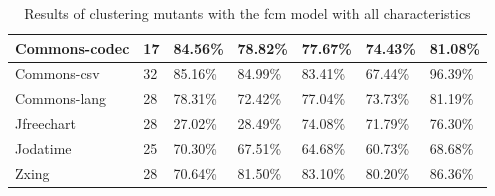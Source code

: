 \documentclass[../../main]{subfiles}
\begin{document}
\begin{table}[!htb]
\begin{tabular}{|l|l|l|l|l|l|l|}
Commons-codec         & 17                   & 84.56\%                           & 78.82\%                                                & 77.67\%                            & 74.43\%                                                                                                                                    & 81.08\%                                                                                                                                    \\ \hline
Commons-csv           & 32                   & 85.16\%                           & 84.99\%                                                & 83.41\%                            & 67.44\%                                                                                                                                    & 96.39\%                                                                                                                                    \\ \hline
Commons-lang          & 28                   & 78.31\%                           & 72.42\%                                                & 77.04\%                            & 73.73\%                                                                                                                                    & 81.19\%                                                                                                                                    \\ \hline
Jfreechart            & 28                   & 27.02\%                           & 28.49\%                                                & 74.08\%                            & 71.79\%                                                                                                                                    & 76.30\%                                                                                                                                    \\ \hline
Jodatime              & 25                   & 70.30\%                           & 67.51\%                                                & 64.68\%                            & 60.73\%                                                                                                                                    & 68.68\%                                                                                                                                    \\ \hline
Zxing                 & 28                   & 70.64\%                           & 81.50\%                                                & 83.10\%                            & 80.20\%                                                                                                                                    & 86.36\%                                                                                                                                    \\ \hline
\end{tabular}
\caption{\label{tab:ml_full}Results of clustering mutants with the \acrshort{fcm} model with all characteristics}
\end{table}
\end{document}
